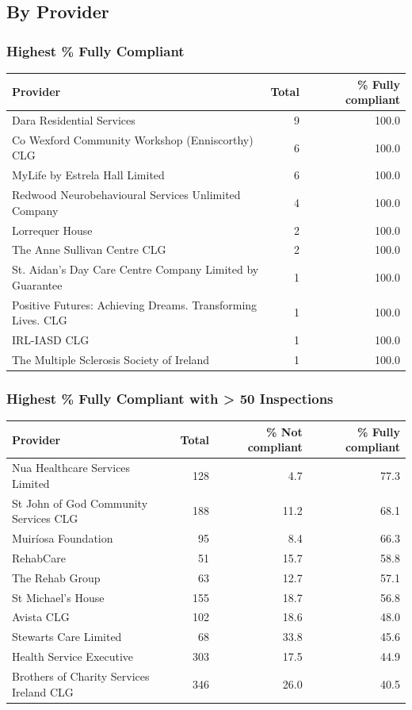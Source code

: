 \documentclass[a4paper,11pt,twoside]{article}
\begin{document}
\subsection{By Provider}
\label{sec:org6e6a4e5}

\subsubsection{Highest \% Fully Compliant}
\label{sec:orgba57fa3}
\begin{center}
\begin{tabular}{lrr}
Provider & Total & \% Fully compliant\\[0pt]
\hline
Dara Residential Services & 9 & 100.0\\[0pt]
Co Wexford Community Workshop (Enniscorthy) CLG & 6 & 100.0\\[0pt]
MyLife by Estrela Hall Limited & 6 & 100.0\\[0pt]
Redwood Neurobehavioural Services Unlimited Company & 4 & 100.0\\[0pt]
Lorrequer House & 2 & 100.0\\[0pt]
The Anne Sullivan Centre CLG & 2 & 100.0\\[0pt]
St. Aidan's Day Care Centre Company Limited by Guarantee & 1 & 100.0\\[0pt]
Positive Futures: Achieving Dreams. Transforming Lives. CLG & 1 & 100.0\\[0pt]
IRL-IASD CLG & 1 & 100.0\\[0pt]
The Multiple Sclerosis Society of Ireland & 1 & 100.0\\[0pt]
\end{tabular}
\end{center}
\subsubsection{Highest \% Fully Compliant with > 50 Inspections}
\label{sec:orgdc75fc0}

\begin{center}
\begin{tabular}{lrrr}
Provider & Total & \% Not compliant & \% Fully compliant\\[0pt]
\hline
Nua Healthcare Services Limited & 128 & 4.7 & 77.3\\[0pt]
St John of God Community Services CLG & 188 & 11.2 & 68.1\\[0pt]
Muiríosa Foundation & 95 & 8.4 & 66.3\\[0pt]
RehabCare & 51 & 15.7 & 58.8\\[0pt]
The Rehab Group & 63 & 12.7 & 57.1\\[0pt]
St Michael's House & 155 & 18.7 & 56.8\\[0pt]
Avista CLG & 102 & 18.6 & 48.0\\[0pt]
Stewarts Care Limited & 68 & 33.8 & 45.6\\[0pt]
Health Service Executive & 303 & 17.5 & 44.9\\[0pt]
Brothers of Charity Services Ireland CLG & 346 & 26.0 & 40.5\\[0pt]
\end{tabular}
\end{center}
\end{document}
